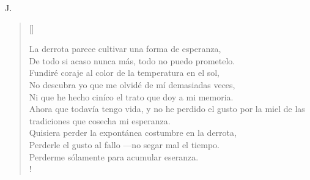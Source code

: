 \documentclass[11pt, a4paper]{article} %
\newcommand{\poemauthorright}[1]{\nopagebreak{\raggedleft\footnotesize\textsc{#1}\par}} %
\begin{document}
{ J}.


\poemtitle{}

\settowidth{\versewidth}{If you can meet with Triumph and Disaster} %

\begin{verse}[\versewidth]
{\scriptsize


La derrota parece cultivar una forma de esperanza, \\
De todo si acaso nunca más, todo no puedo prometelo. \\
Fundiré coraje al color de la temperatura en el sol, \\
No descubra yo que me olvidé de mí demasiadas veces, \\
Ni que he hecho ciníco el trato que doy a mi memoria. \\
Ahora que todavía tengo vida, y no he perdido el gusto por la miel de las tradiciones que cosecha mi esperanza. \\
Quisiera perder la expontánea costumbre en la derrota, \\
Perderle el gusto al fallo ---no segar mal el tiempo. \\
Perderme sólamente para acumular eseranza. \\!
}
\end{verse}


\poemauthorright{} %

\end{document}
